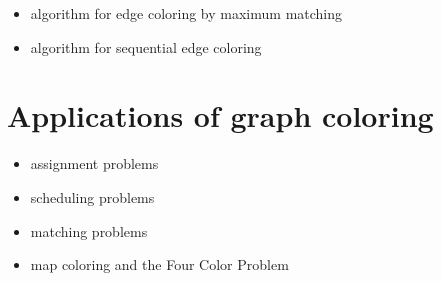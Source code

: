 \begin{itemize}
\item algorithm for edge coloring by maximum matching
\item algorithm for sequential edge coloring
\end{itemize}



\section{Applications of graph coloring}

\begin{itemize}
\item assignment problems

\item scheduling problems

\item matching problems

\item map coloring and the Four Color Problem
\end{itemize}
